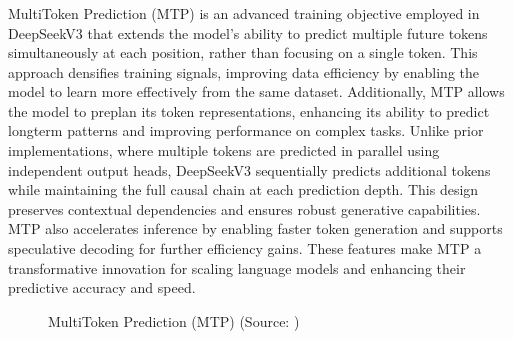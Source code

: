 \documentclass[letterpaper,11pt,english]{sphinxmanual}
\begin{document}
\subsubsection{}
\label{\detokenize{pretraining:multi-token-prediction-mtp}}
\sphinxAtStartPar
Multi\sphinxhyphen{}Token Prediction (MTP) is an advanced training objective
employed in DeepSeek\sphinxhyphen{}V3 that extends the model’s ability to predict
multiple future tokens simultaneously at each position, rather than
focusing on a single token. This approach densifies training signals,
improving data efficiency by enabling the model to learn more
effectively from the same dataset. Additionally, MTP allows the model
to pre\sphinxhyphen{}plan its token representations, enhancing its ability to
predict long\sphinxhyphen{}term patterns and improving performance on complex tasks.
Unlike prior implementations, where multiple tokens are predicted in
parallel using independent output heads, DeepSeek\sphinxhyphen{}V3 sequentially
predicts additional tokens while maintaining the full causal chain at
each prediction depth. This design preserves contextual dependencies
and ensures robust generative capabilities. MTP also accelerates
inference by enabling faster token generation and supports speculative
decoding for further efficiency gains. These features make MTP a
transformative innovation for scaling language models and enhancing
their predictive accuracy and speed.

\begin{figure}[htbp]
\centering
\capstart

\noindent{}
\caption{Multi\sphinxhyphen{}Token Prediction (MTP) (Source: )}\label{\detokenize{pretraining:id31}}\end{figure}
\end{document}
